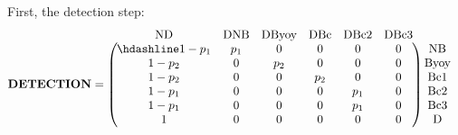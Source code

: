 \documentclass[
  12pt,
]{krantz}
\begin{document}
First, the detection step:
\[
\begin{matrix}
& \\
\mathbf{DETECTION} =
\left ( \vphantom{ \begin{matrix} 12 \\ 12 \\ 12 \\ 12 \\ 12 \\ 12 \end{matrix} } \right .
\end{matrix}
\hspace{-1.2em}
\begin{matrix}
\text{ND} & \text{DNB} & \text{DByoy} & \text{DBc} & \text{DBc2} & \text{DBc3} \\ \hdashline
1 - p_1 & p_1 & 0 & 0 & 0 & 0 \\
1 - p_2 & 0 & p_2 & 0 & 0 & 0 \\
1 - p_2 & 0 & 0 & p_2 & 0 & 0 \\
1 - p_1 & 0 & 0 & 0 & p_1 & 0 \\
1 - p_1 & 0 & 0 & 0 & p_1 & 0 \\
1 & 0 & 0 & 0 & 0 & 0
\end{matrix}
\hspace{-0.2em}
\begin{matrix}
& \\
\left . \vphantom{ \begin{matrix} 12 \\ 12 \\ 12 \\ 12 \\ 12 \\ 12 \end{matrix} } \right )
\begin{matrix}
\text{NB} \\
\text{Byoy} \\
\text{Bc1} \\
\text{Bc2} \\
\text{Bc3} \\
\text{D}
\end{matrix}
\end{matrix}
\]
\end{document}
